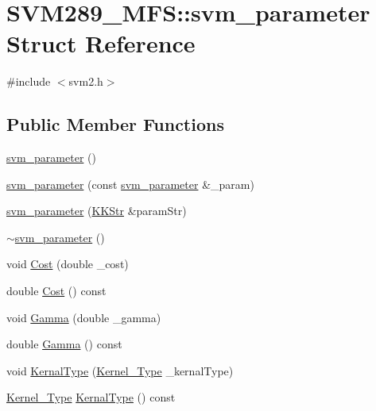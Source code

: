 \hypertarget{struct_s_v_m289___m_f_s_1_1svm__parameter}{}\section{S\+V\+M289\+\_\+\+M\+FS\+:\+:svm\+\_\+parameter Struct Reference}
\label{struct_s_v_m289___m_f_s_1_1svm__parameter}


{\ttfamily \#include $<$svm2.\+h$>$}

\subsection*{Public Member Functions}
\begin{DoxyCompactItemize}
\item 
\hyperlink{struct_s_v_m289___m_f_s_1_1svm__parameter_a559c9817cef2e1209c66bfe1e8117d72}{svm\+\_\+parameter} ()
\item 
\hyperlink{struct_s_v_m289___m_f_s_1_1svm__parameter_afc3b94e362c9844ecf811e5f653905a3}{svm\+\_\+parameter} (const \hyperlink{struct_s_v_m289___m_f_s_1_1svm__parameter}{svm\+\_\+parameter} \&\+\_\+param)
\item 
\hyperlink{struct_s_v_m289___m_f_s_1_1svm__parameter_a7def52159a91cf63bee6e6b8c909eff3}{svm\+\_\+parameter} (\hyperlink{class_k_k_b_1_1_k_k_str}{K\+K\+Str} \&param\+Str)
\item 
\hyperlink{struct_s_v_m289___m_f_s_1_1svm__parameter_aa819be28adec682476126899e5d431f3}{$\sim$svm\+\_\+parameter} ()
\item 
void \hyperlink{struct_s_v_m289___m_f_s_1_1svm__parameter_a5cdeb88049c4480323405e304c8422d7}{Cost} (double \+\_\+cost)
\item 
double \hyperlink{struct_s_v_m289___m_f_s_1_1svm__parameter_a6be26b937b70eeb7d70da467a8b7c621}{Cost} () const 
\item 
void \hyperlink{struct_s_v_m289___m_f_s_1_1svm__parameter_a1fa20dd4a76fb890b010602667927015}{Gamma} (double \+\_\+gamma)
\item 
double \hyperlink{struct_s_v_m289___m_f_s_1_1svm__parameter_a9cd933754053d6223d3cac2f9fe2d8f7}{Gamma} () const 
\item 
void \hyperlink{struct_s_v_m289___m_f_s_1_1svm__parameter_a44599c9e724b08ed8285dfd253d415b3}{Kernal\+Type} (\hyperlink{namespace_s_v_m289___m_f_s_ad985d190115342f6434e0ed8816b6e29}{Kernel\+\_\+\+Type} \+\_\+kernal\+Type)
\item 
\hyperlink{namespace_s_v_m289___m_f_s_ad985d190115342f6434e0ed8816b6e29}{Kernel\+\_\+\+Type} \hyperlink{struct_s_v_m289___m_f_s_1_1svm__parameter_ae4522a3033495bcc267bdc2f268909f9}{Kernal\+Type} () const 

\end{DoxyCompactItemize}
